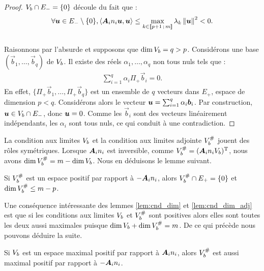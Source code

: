 \begin{proof}
	$V_b \cap E_{-} = \lbrace 0 \rbrace$
	découle du fait que :
	\begin{align}
		\forall \bm{u} \in E_{-} \setminus \lbrace 0 \rbrace ,
		\left\langle {\bm{A}_{i}n_{i}} \bm{u} , \bm{u} \right\rangle \le
		\max_{k \in \lbrack\!\lbrack p+1\,;\,m\rbrack\!\rbrack} \lambda_{k} \left\Vert\bm{u}\right\Vert^2 < 0 .
	\end{align}
	\\
	Raisonnons par l'absurde et supposons que $\dim V_b = q > p$.
	Considérons une base $(\Vec{b}_1 , \ldots , \Vec{b}_q)$ de $V_b$.
	Il existe des réels $\alpha_1 , \ldots , \alpha_q$
	non tous nuls tels que :
	\begin{align}
		\sum_{i=1}^{q} \alpha_i \Pi_{+} \Vec{b}_i = 0 .
	\end{align}
	En effet, $\lbrace \Pi_{+} \Vec{b}_1 , \ldots , \Pi_{+} \Vec{b}_q \rbrace$
	est un ensemble de $q$ vecteurs dans $E_{+}$,
	espace de dimension $p < q$.
	Considérons alors le vecteur $\bm{u} = \sum_{i=1}^{q} \alpha_i \bm{b}_i$.
	Par construction, $\bm{u} \in V_b \cap E_{-}$, donc $\bm{u} = 0$.
	Comme les $\Vec{b}_i$ sont des vecteurs linéairement indépendants,
	les $\alpha_i$ sont tous nuls, ce qui conduit à une contradiction.
\end{proof}


La condition aux limites $V_b$
et la condition aux limites adjointe $V_b^{\#}$
jouent des rôles symétriques. Lorsque ${\bm{A}_{i}n_{i}}$ est inversible,
comme $V_b^{\#} = ({\bm{A}_{i}n_{i}} V_b)^{\mathrm{T}}$,
nous avons $\dim V_b^{\#} = m - \dim V_b$.
Nous en déduisons le lemme suivant.

\begin{lemma} \label{lem:cnd_dim_adj}
	Si $V_b^{\#}$ est un espace positif par rapport à $-{\bm{A}_{i}n_{i}}$,
	alors $V_b^{\#} \cap E_{+} = \lbrace 0 \rbrace$
	et $\dim V_b^{\#} \le m - p$.
\end{lemma}

Une conséquence intéressante des lemmes
\ref{lem:cnd_dim} et \ref{lem:cnd_dim_adj} est que si les conditions
aux limites $V_b$ et $V_b^{\#}$
sont positives alors elles sont toutes les deux aussi maximales
puisque $\dim V_b + \dim V_b^{\#} = m$.
De ce qui précède nous pouvons déduire la suite.

\begin{lemma}
	Si $V_b$ est un espace maximal positif par rapport à ${\bm{A}_{i}n_{i}}$,
	alors $V_b^{\#}$ est aussi maximal positif par rapport à
	$-{\bm{A}_{i}n_{i}}$.
\end{lemma}

